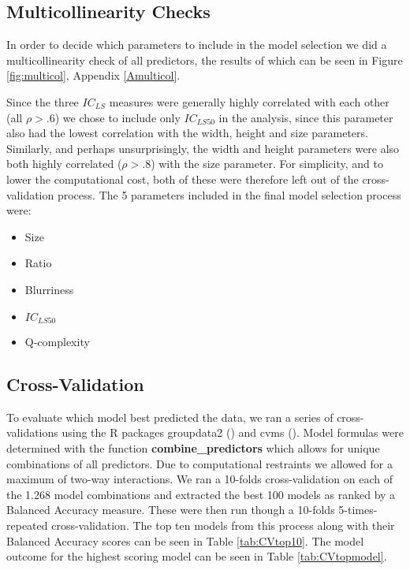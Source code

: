 \documentclass[12pt]{article}
\begin{document}
\subsection{Multicollinearity Checks}
In order to decide which parameters to include in the model selection we did a multicollinearity check of all predictors, the results of which can be seen in Figure \ref{fig:multicol}, Appendix \ref{Amulticol}.

Since the three $IC_{LS}$ measures were generally highly correlated with each other (all $\rho > .6$) we chose to include only $IC_{LS50}$ in the analysis, since this parameter also had the lowest correlation with the width, height and size parameters. 
Similarly, and perhaps unsurprisingly, the width and height parameters were also both highly correlated ($\rho > .8$) with the size parameter. For simplicity, and to lower the computational cost, both of these were therefore left out of the cross-validation process.
The 5 parameters included in the final model selection process were:
\begin{itemize}
	\item Size
	\item Ratio
	\item Blurriness
	\item $IC_{LS50}$
	\item Q-complexity
\end{itemize}

\subsection{Cross-Validation}
To evaluate which model best predicted the data, we ran a series of cross-validations using the R packages groupdata2 (\cite{olsenGroupdata22020}) and cvms (\cite{olsenCvms2020}).
Model formulas were determined with the function \textbf{combine\_predictors} which allows for unique combinations of all predictors. Due to computational restraints we allowed for a maximum of two-way interactions. We ran a 10-folds cross-validation on each of the 1.268 model combinations and extracted the best 100 models as ranked by a Balanced Accuracy measure. These were then run though a 10-folds 5-times-repeated cross-validation. The top ten models from this process along with their Balanced Accuracy scores can be seen in Table \ref{tab:CVtop10}. The model outcome for the highest scoring model can be seen in Table \ref{tab:CVtopmodel}.
\end{document}
